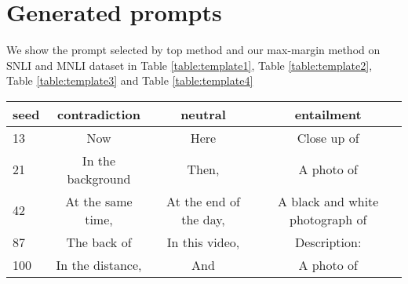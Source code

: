 \section{Generated prompts}

We show the prompt selected by top method and our max-margin method on SNLI and MNLI dataset in Table \ref{table:template1}, Table \ref{table:template2}, Table \ref{table:template3} and Table \ref{table:template4}



\begin{table*}[!h]
	\centering
	\small
	\begin{tabular}{l|ccc}
		\toprule
		\textbf{seed} & \textbf{contradiction} & \textbf{neutral} & \textbf{entailment}\\
		\midrule
		13  & Now &  Here & Close up of \\
		21   & In the background &  Then, & A photo of \\
		42   & At the same time, & At the end of the day, & A black and white photograph of \\
		87   & The back of  & In this video, & Description: \\
		100   & In the distance, &  And & A photo of \\
		\bottomrule
	\end{tabular}
	\caption{Generated templates of top method in SNLI dataset}
	\label{table:template1}
\end{table*}

